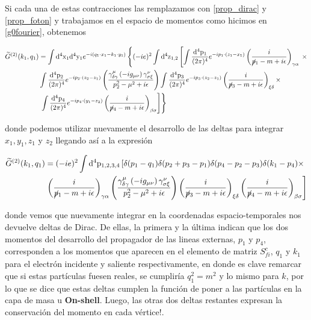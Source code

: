 \documentclass[tickz]{article}
\numberwithin{equation}{section}
\begin{document}
Si cada una de estas contracciones las remplazamos con \ref{prop_dirac} y \ref{prop_foton} y trabajamos
en el espacio de momentos como hicimos en \ref{g0fourier}, obtenemos

\begin{equation}\label{key}
\begin{aligned}
\widetilde{G}^{(2)}(k_{1},q_{1})&=\int \mathrm{d^4x_1}\mathrm{d^4y_1} e^{-i (q_1 \cdot x_1-k_1 \cdot y_1)} \left\{  (-ie)^{2}\int \mathrm{\mathrm{d^4}z_{1,2}}  \left[  \int\frac{\mathrm{\mathrm{d^4}p_1}}{(2\pi)^{4}}e^{-ip_1\cdot(z_{1}-x_{1})}\left(\frac{i}{\cancel{p}_1-m+i\epsilon}\right)_{\gamma\alpha} \right. \right. \times \\ &\int\frac{\mathrm{\mathrm{d^4}p_2}}{(2\pi)^{4}}e^{-ip_2\cdot(z_2-z_1)}\left(\frac{\gamma_{\delta\gamma}^{\mu} \left(-ig_{\mu\nu}\right) \gamma_{\sigma\xi}^{\nu}}{p^2_2 -\mu^2 +i\epsilon}\right) \int\frac{\mathrm{\mathrm{d^4}p_3}}{(2\pi)^{4}}e^{-ip_3\cdot(z_{2}-z_{1})}\left(\frac{i}{\cancel{p}_3-m+i\epsilon}\right)_{\xi\delta} \times \\
& \left. \left. \int\frac{\mathrm{\mathrm{d^4}p_4}}{(2\pi)^{4}}e^{-ip_4\cdot(y_{1}-z_{2})}\left(\frac{i}{\cancel{p}_4-m+i\epsilon}\right)_{\beta\sigma}  \right]  \right\}
\end{aligned}
\end{equation}

donde podemos utilizar nuevamente el desarrollo de las deltas para integrar $ x_1, y_1, z_1 $ y $ z_2 $  llegando así a la expresión

\begin{equation}\label{key}
\begin{aligned}
\widetilde{G}^{(2)}(k_{1},q_{1})&=(-ie)^{2} \int \mathrm{\mathrm{d^4}p_{1,2,3,4}}  \left[  \delta (p_1 -q_1) \delta(p_2 + p_3 - p_1) \delta (p_4 - p_2 - p_3) \delta (k_1 - p_4) \times \right.\\
& \left. \left(\frac{i}{\cancel{p}_1-m+i\epsilon}\right)_{\gamma\alpha} \left(\frac{\gamma_{\delta\gamma}^{\mu} \left(-ig_{\mu\nu}\right) \gamma_{\sigma\xi}^{\nu}}{p^2_2 -\mu^2 +i\epsilon}\right) \left(\frac{i}{\cancel{p}_3-m+i\epsilon}\right)_{\xi\delta} \left(\frac{i}{\cancel{p}_4-m+i\epsilon}\right)_{\beta\sigma}  \right] 
\end{aligned}
\end{equation}

donde vemos que nuevamente integrar en la coordenadas espacio-temporales nos devuelve deltas de Dirac. De ellas, la primera y la última indican que los dos momentos del desarrollo del propagador de las lineas externas, $p_{1}$ y $p_{4}$, corresponden a los momentos que aparecen en el elemento de matriz $S_{fi}^{c}$, $q_{1}$ y $k_{1}$ para el electrón incidente y saliente respectivamente, en donde es clave remarcar que si estas partículas fuesen reales, se cumpliría $q_{1}^{2}=m^{2}$ y lo mismo para $k$, por lo que se dice que estas deltas cumplen la función de poner a las partículas en la capa de masa u
\textbf{On-shell}. Luego, las otras dos deltas restantes expresan la conservación del momento en cada vértice!.
\end{document}
